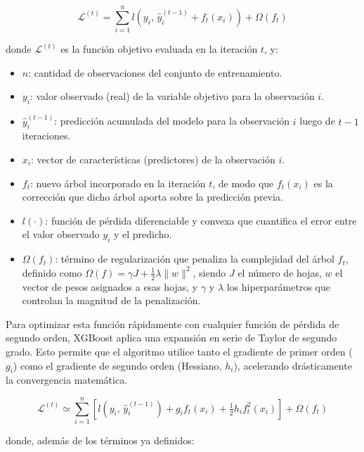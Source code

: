 \begin{equation}
\mathcal{L}^{(t)} = \sum_{i=1}^{n} l\left(y_i,\, \hat{y}_i^{(t-1)} + f_t(x_i)\right) + \Omega(f_t)
\label{eq:xgb-objetivo}
\end{equation}

donde $\mathcal{L}^{(t)}$ es la función objetivo evaluada en la iteración $t$, y:

\begin{itemize}
  \item $n$: cantidad de observaciones del conjunto de entrenamiento.
  \item $y_i$: valor observado (real) de la variable objetivo para la observación $i$.
  \item $\hat{y}_i^{(t-1)}$: predicción acumulada del modelo para la observación $i$ luego de $t-1$ iteraciones.
  \item $x_i$: vector de características (predictores) de la observación $i$.
  \item $f_t$: nuevo árbol incorporado en la iteración $t$, de modo que $f_t(x_i)$ es la corrección que dicho árbol aporta sobre la predicción previa.
  \item $l(\cdot)$: función de pérdida diferenciable y convexa que cuantifica el error entre el valor observado $y_i$ y el predicho.
  \item $\Omega(f_t)$: término de regularización que penaliza la complejidad del árbol $f_t$, definido como $\Omega(f) = \gamma J + \tfrac{1}{2} \lambda \lVert w \rVert^{2}$, siendo $J$ el número de hojas, $w$ el vector de pesos asignados a esas hojas, y $\gamma$ y $\lambda$ los hiperparámetros que controlan la magnitud de la penalización.
\end{itemize}

Para optimizar esta función rápidamente con cualquier función de pérdida de segundo orden, XGBoost aplica una expansión en serie de Taylor de segundo grado. Esto permite que el algoritmo utilice tanto el gradiente de primer orden ($g_i$) como el gradiente de segundo orden (Hessiano, $h_i$), acelerando drásticamente la convergencia matemática.

\begin{equation}
\mathcal{L}^{(t)} \simeq \sum_{i=1}^{n} \left[ l\left(y_i,\, \hat{y}_i^{(t-1)}\right) + g_i f_t(x_i) + \tfrac{1}{2} h_i f_t^{2}(x_i) \right] + \Omega(f_t)
\label{eq:xgb-taylor}
\end{equation}

donde, además de los términos ya definidos:

